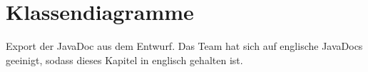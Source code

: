 \chapter{Klassendiagramme}
\label{ch:klassendiagramme}

Export der JavaDoc aus dem Entwurf. Das Team hat sich auf englische JavaDocs geeinigt, sodass dieses Kapitel in englisch gehalten ist.













